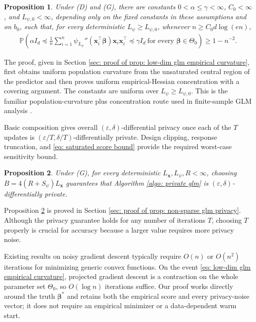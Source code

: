 \documentclass[letterpaper,12pt]{article}
\numberwithin{equation}{section}
\theoremstyle{plain}
\numberwithin{Theorem}{section}
\newtheorem{proposition}{Proposition}
\numberwithin{proposition}{section}
\numberwithin{Lemma}{section}
{
	\theoremstyle{definition}
	\newtheorem{Definition}{Definition}
	\newtheorem{example}{Example}
	\numberwithin{example}{section}
	\newtheorem{fact}{Fact}
	\numberwithin{fact}{section}
	\newtheorem{remark}{Remark}
}
\newcommand{\Pro}{\mathbb{P}}
\newcommand{\1}{\mathbbm{1}}
\def\bbeta{{\boldsymbol{\beta}}}
\begin{document}
\begin{proposition}\label{prop: low-dim glm empirical curvature}
	Under (D) and (G), there are constants $0<\alpha\leq\gamma<\infty$, $C_0<\infty$, and $L_{\psi,0}<\infty$, depending only on the fixed constants in these assumptions and on $b_0$, such that, for every deterministic $L_\psi\geq L_{\psi,0}$, whenever $n\geq C_0d\log(en)$,
	\begin{align}\label{eq: low-dim glm empirical curvature}
	\Pro\!\left(\alpha I_d\preceq \frac1n\sum_{i=1}^n\psi_{L_\psi}''(\bm x_i^\top\bbeta)\bm x_i\bm x_i^\top\preceq\gamma I_d
	\ \text{for every }\bbeta\in\Theta_0\right)\geq1-n^{-2}.
	\end{align}
\end{proposition}
The proof, given in Section \ref{sec: proof of prop: low-dim glm empirical curvature}, first obtains uniform population curvature from the unsaturated central region of the predictor and then proves uniform empirical-Hessian concentration with a covering argument.  The constants are uniform over $L_\psi\geq L_{\psi,0}$. This is the familiar population-curvature plus concentration route used in finite-sample GLM analysis \cite{mei2018landscape,ostrovskii2021finite}.

Basic composition gives overall $(\varepsilon,\delta)$-differential privacy once each of the $T$ updates is $(\varepsilon/T,\delta/T)$-differentially private.  Design clipping, response truncation, and \eqref{eq: saturated score bound} provide the required worst-case sensitivity bound.

\begin{proposition}\label{prop: non-sparse glm privacy}
	Under (G), for every deterministic $L_{\bm x},L_\psi,R<\infty$, choosing $B = 4(R + S_\psi)L_{\bm x}$ guarantees that Algorithm \ref{algo: private glm} is $(\varepsilon, \delta)$-differentially private.
\end{proposition}
Proposition \ref{prop: non-sparse glm privacy} is proved in Section \ref{sec: proof of prop: non-sparse glm privacy}. Although the privacy guarantee holds for any number of iterations $T$, choosing $T$ properly is crucial for accuracy because a larger value requires more privacy noise.

{Existing results on noisy gradient descent typically require $O(n)$ \cite{bassily2019private} or $O(n^2)$ \cite{bassily2014private} iterations for minimizing generic convex functions. On the event \eqref{eq: low-dim glm empirical curvature}, projected gradient descent is a contraction on the whole parameter set $\Theta_0$, so $O(\log n)$ iterations suffice.  Our proof works directly around the truth $\bbeta^*$ and retains both the empirical score and every privacy-noise vector; it does not require an empirical minimizer or a data-dependent warm start.}
\end{document}
